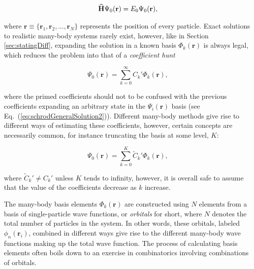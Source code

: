 \begin{equation}
 {\bf\widehat{H}}\Psi_0(\mathbf{r}) = E_0\Psi_0(\mathbf{r}),
 \end{equation}
 
where $\mathbf{r} \equiv \{\mathbf{r}_1, \mathbf{r}_2, ..., \mathbf{r}_N\}$ represents the position of every particle. Exact solutions to realistic many-body systems rarely exist, however, like in Section \ref{sec:statingDiff}, expanding the solution in a known basis $\Phi_k(\mathbf{r})$ is always legal, which reduces the problem into that of a \textit{coefficient hunt} 

\begin{equation}
\label{eq:manyBodyExp}
 \Psi_0(\mathbf{r}) = \sum_{k=0}^\infty C_k'\Phi_k(\mathbf{r}),
\end{equation}

where the primed coefficients should not to be confused with the previous coefficients expanding an arbitrary state in the $\Psi_i(\mathbf{r})$ basis (see Eq.~(\ref{eq:schrodGeneralSolution2})). Different many-body methods give rise to different ways of estimating these coefficients, however, certain concepts are necessarily common, for instance truncating the basis at some level, $K$:

\begin{equation}
 \Psi_0(\mathbf{r}) = \sum_{k=0}^K \tilde{C}_k'\Phi_k(\mathbf{r}), \label{eq:manybodyWFexp}
\end{equation}

where $ \tilde{C}_k' \ne  C_k'$ unless $K$ tends to infinity, however, it is overall safe to assume that the value of the coefficients decrease as $k$ increase. 

The many-body basis elements $\Phi_k(\mathbf{r})$ are constructed using $N$ elements from a basis of single-particle wave functions, or \textit{orbitals} for short, where $N$ denotes the total number of particles in the system. In other words, these orbitals, labeled $\phi_n(\mathbf{r}_i)$, combined in different ways give rise to the different many-body wave functions making up the total wave function. The process of calculating basis elements often boils down to an exercise in combinatorics involving combinations of orbitals.

